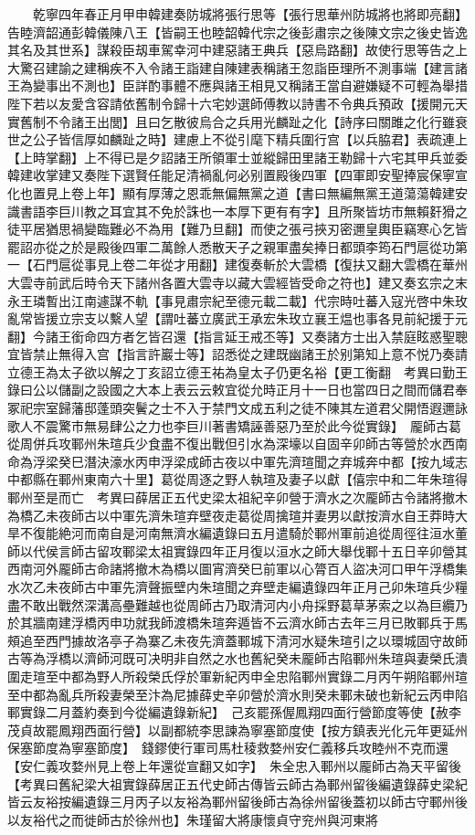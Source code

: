 　　乾寧四年春正月甲申韓建奏防城將張行思等【張行思華州防城將也將即亮翻】告睦濟韶通彭韓儀陳八王【皆嗣王也睦韶韓代宗之後彭肅宗之後陳文宗之後史皆逸其名及其世系】謀殺臣刼車駕幸河中建惡諸王典兵【惡烏路翻】故使行思等告之上大驚召建諭之建稱疾不入令諸王詣建自陳建表稱諸王忽詣臣理所不測事端【建言諸王為變事出不測也】臣詳酌事體不應與諸王相見又稱諸王當自避嫌疑不可輕為舉措陛下若以友愛含容請依舊制令歸十六宅妙選師傅教以詩書不令典兵預政【援開元天實舊制不令諸王出閭】且曰乞散彼烏合之兵用光麟趾之化【詩序曰關雎之化行雖衰世之公子皆信厚如麟趾之時】建慮上不從引麾下精兵圍行宫【以兵脇君】表疏連上【上時掌翻】上不得已是夕詔諸王所領軍士並縱歸田里諸王勒歸十六宅其甲兵並委韓建收掌建又奏陛下選賢任能足清禍亂何必别置殿後四軍【四軍即安聖捧宸保寧宣化也置見上卷上年】顯有厚薄之恩乖無偏無黨之道【書曰無編無黨王道蕩蕩韓建安識書語李巨川教之耳宜其不免於誅也一本厚下更有有字】且所聚皆坊市無賴姧猾之徒平居猶思禍變臨難必不為用【難乃旦翻】而使之張弓挾刃密邇皇輿臣竊寒心乞皆罷詔亦從之於是殿後四軍二萬餘人悉散天子之親軍盡矣捧日都頭李筠石門扈從功第一【石門扈從事見上卷二年從才用翻】建復奏斬於大雲橋【復扶又翻大雲橋在華州大雲寺前武后時令天下諸州各置大雲寺以藏大雲經皆受命之符也】建又奏玄宗之末永王璘暫出江南遽謀不軌【事見肅宗紀至德元載二載】代宗時吐蕃入寇光啓中朱玫亂常皆援立宗支以繫人望【謂吐蕃立廣武王承宏朱玫立襄王煴也事各見前紀援于元翻】今諸王銜命四方者乞皆召還【指言延王戒丕等】又奏諸方士出入禁庭眩惑聖聰宜皆禁止無得入宫【指言許巖士等】詔悉從之建既幽諸王於别第知上意不悦乃奏請立德王為太子欲以解之丁亥詔立德王祐為皇太子仍更名裕【更工衡翻　考異曰勤王錄曰公以儲副之設國之大本上表云云敕宜從允時正月十一日也當四日之間而儲君奉冢祀宗室歸藩邸蓬頭突鬢之士不入于禁門文成五利之徒不陳其左道君父開悟遐邇詠歌人不震驚市無易肆公之力也李巨川著書矯誣善惡乃至於此今從實錄】　龎師古葛從周併兵攻鄆州朱瑄兵少食盡不復出戰但引水為深壕以自固辛卯師古等營於水西南命為浮梁癸巳潛決濠水丙申浮梁成師古夜以中軍先濟瑄聞之弃城奔中都【按九域志中都縣在鄆州東南六十里】葛從周逐之野人執瑄及妻子以獻【僖宗中和二年朱瑄得鄆州至是而亡　考異曰薛居正五代史梁太祖紀辛卯營于濟水之次龎師古令諸將撤木為橋乙未夜師古以中軍先濟朱瑄弃壁夜走葛從周擒瑄并妻男以獻按濟水自王莽時大旱不復能絶河而南自是河南無濟水編遺錄曰五月遣騎於鄆州軍前追從周徑往洹水董師以代侯言師古留攻鄆梁太祖實錄四年正月復以洹水之師大舉伐鄆十五日辛卯營其西南河外龎師古命諸將撤木為橋以圖宵濟癸巳前軍以心膂百人盜决河口甲午浮橋集水次乙未夜師古中軍先濟聲振壁内朱瑄聞之弃壁走編遺錄四年正月己卯朱瑄兵少糧盡不敢出戰然深溝高壘難越也從周師古乃取清河内小舟採野葛草茅索之以為巨纜乃於其牆南建浮橋丙申功就我師渡橋朱瑄奔遁皆不云濟水師古去年三月已敗鄆兵于馬頰追至西門據故洛亭子為寨乙未夜先濟蓋鄆城下清河水疑朱瑄引之以環城固守故師古等為浮橋以濟師河既可决明非自然之水也舊紀癸未龎師古陷鄆州朱瑄與妻榮氏潰圍走瑄至中都為野人所殺榮氏俘於軍新紀丙申全忠陷鄆州實錄二月丙午朔陷鄆州瑄至中都為亂兵所殺妻榮至汴為尼據薛史辛卯營於濟水則癸未鄆未破也新紀云丙申陷鄆實錄二月蓋約奏到今從編遺錄新紀】　己亥罷孫偓鳳翔四面行營節度等使【赦李茂貞故罷鳳翔西面行營】以副都統李思諫為寧塞節度使【按方鎮表光化元年更延州保塞節度為寧塞節度】　錢鏐使行軍司馬杜稜救婺州安仁義移兵攻睦州不克而還【安仁義攻婺州見上卷上年還從宣翻又如字】　朱全忠入鄆州以龎師古為天平留後　【考異曰舊紀梁大祖實錄薛居正五代史師古傳皆云師古為鄆州留後編遺錄薛史梁紀皆云友裕按編遺錄三月丙子以友裕為鄆州留後師古為徐州留後蓋初以師古守鄆州後以友裕代之而徙師古於徐州也】朱瑾留大將康懷貞守兖州與河東將
